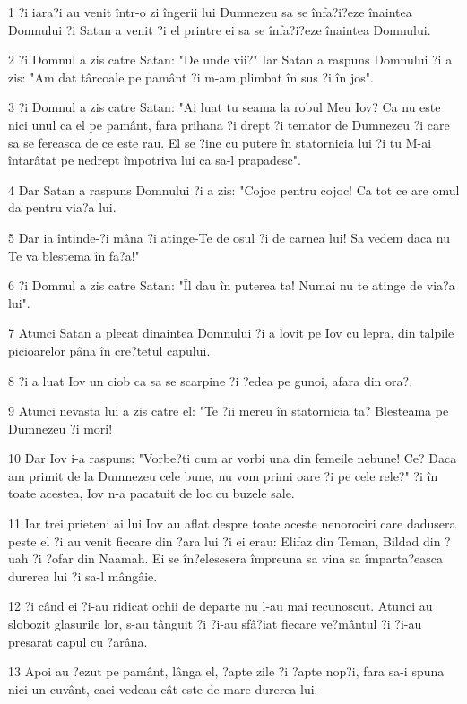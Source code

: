 \par 1 ?i iara?i au venit într-o zi îngerii lui Dumnezeu sa se înfa?i?eze înaintea Domnului ?i Satan a venit ?i el printre ei sa se înfa?i?eze înaintea Domnului.
\par 2 ?i Domnul a zis catre Satan: "De unde vii?" Iar Satan a raspuns Domnului ?i a zis: "Am dat târcoale pe pamânt ?i m-am plimbat în sus ?i în jos".
\par 3 ?i Domnul a zis catre Satan: "Ai luat tu seama la robul Meu Iov? Ca nu este nici unul ca el pe pamânt, fara prihana ?i drept ?i temator de Dumnezeu ?i care sa se fereasca de ce este rau. El se ?ine cu putere în statornicia lui ?i tu M-ai întarâtat pe nedrept împotriva lui ca sa-l prapadesc".
\par 4 Dar Satan a raspuns Domnului ?i a zis: "Cojoc pentru cojoc! Ca tot ce are omul da pentru via?a lui.
\par 5 Dar ia întinde-?i mâna ?i atinge-Te de osul ?i de carnea lui! Sa vedem daca nu Te va blestema în fa?a!"
\par 6 ?i Domnul a zis catre Satan: "Îl dau în puterea ta! Numai nu te atinge de via?a lui".
\par 7 Atunci Satan a plecat dinaintea Domnului ?i a lovit pe Iov cu lepra, din talpile picioarelor pâna în cre?tetul capului.
\par 8 ?i a luat Iov un ciob ca sa se scarpine ?i ?edea pe gunoi, afara din ora?.
\par 9 Atunci nevasta lui a zis catre el: "Te ?ii mereu în statornicia ta? Blesteama pe Dumnezeu ?i mori!
\par 10 Dar Iov i-a raspuns: "Vorbe?ti cum ar vorbi una din femeile nebune! Ce? Daca am primit de la Dumnezeu cele bune, nu vom primi oare ?i pe cele rele?" ?i în toate acestea, Iov n-a pacatuit de loc cu buzele sale.
\par 11 Iar trei prieteni ai lui Iov au aflat despre toate aceste nenorociri care dadusera peste el ?i au venit fiecare din ?ara lui ?i ei erau: Elifaz din Teman, Bildad din ?uah ?i ?ofar din Naamah. Ei se în?elesesera împreuna sa vina sa împarta?easca durerea lui ?i sa-l mângâie.
\par 12 ?i când ei ?i-au ridicat ochii de departe nu l-au mai recunoscut. Atunci au slobozit glasurile lor, s-au tânguit ?i ?i-au sfâ?iat fiecare ve?mântul ?i ?i-au presarat capul cu ?arâna.
\par 13 Apoi au ?ezut pe pamânt, lânga el, ?apte zile ?i ?apte nop?i, fara sa-i spuna nici un cuvânt, caci vedeau cât este de mare durerea lui.

